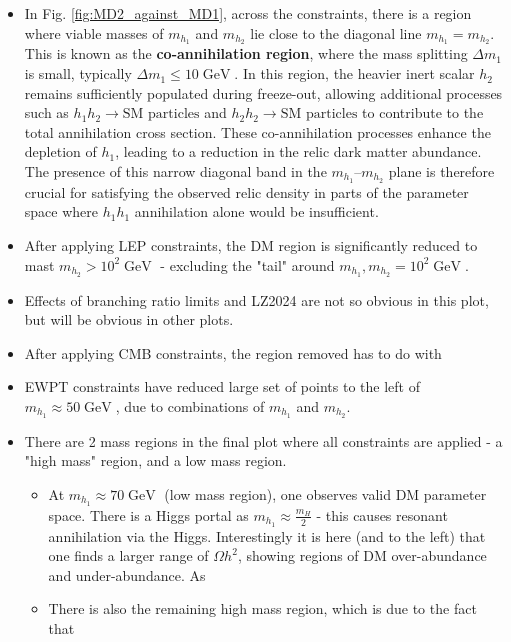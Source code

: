 \documentclass[12pt]{article}
\newcommand{\gev}{\mathrel{\text{ GeV}}}
\newcommand{\mhone}{m_{h_1}}
\newcommand{\mhtwo}{m_{h_2}}
\begin{document}
\begin{itemize}
    \item In Fig.  \ref{fig:MD2_against_MD1}, across the constraints, there is a region where viable masses of $\mhone$ and $\mhtwo$ lie close to the diagonal line $\mhone = \mhtwo$. This is known as the \textbf{co-annihilation region}, where the mass splitting $\Delta m_1 $ is small, typically $\Delta m_1 \leq 10 \gev$. In this region, the heavier inert scalar $h_2$ remains sufficiently populated during freeze-out, allowing additional processes such as $h_1 h_2 \rightarrow \text{SM particles}$ and $h_2 h_2 \rightarrow \text{SM particles}$ to contribute to the total annihilation cross section. These co-annihilation processes enhance the depletion of $h_1$, leading to a reduction in the relic dark matter abundance. The presence of this narrow diagonal band in the $m_{h_1}$–$m_{h_2}$ plane is therefore crucial for satisfying the observed relic density in parts of the parameter space where $h_1 h_1$ annihilation alone would be insufficient.
    \item After applying LEP constraints, the DM region is significantly reduced to mast $\mhtwo > 10^2 \gev$ - excluding the "tail" around $\mhone ,\mhtwo = 10^2 \gev$. 
    \item Effects of branching ratio limits and LZ2024 are not so obvious in this plot, but will be obvious in other plots.
    \item After applying CMB constraints, the region removed has to do with 
    \item EWPT constraints have reduced large set of points to the left of $\mhone \approx50 \gev$, due to combinations of $\mhone$ and $\mhtwo$.
    \item There are 2 mass regions in the final plot where all constraints are applied - a "high mass" region, and a low mass region.
    \begin{itemize}
            \item At $\mhone \approx 70 \gev$ (low mass region), one observes valid DM parameter space. There is a Higgs portal as $\mhone \approx \frac{m_H}{2}$ - this causes resonant annihilation via the Higgs. Interestingly it is here (and to the left) that one finds a larger range of $\Omega h^2$, showing regions of DM over-abundance and under-abundance. As 
    \item There is also the remaining high mass region, which is due to the fact that 
    \end{itemize}
\end{itemize}
\end{document}
